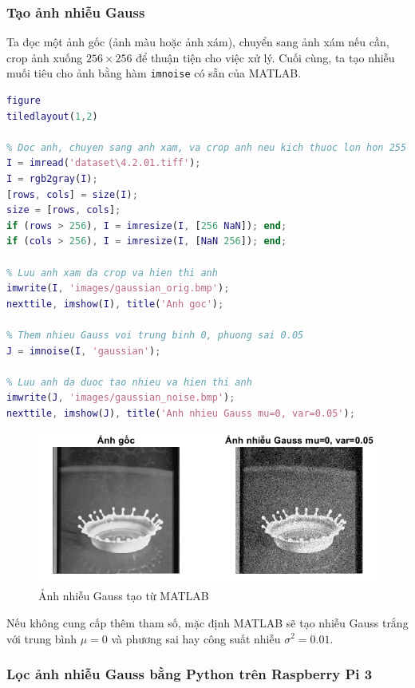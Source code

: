 \subsubsection{Tạo ảnh nhiễu Gauss}

Ta đọc một ảnh gốc (ảnh màu hoặc ảnh xám), chuyển sang ảnh xám nếu cần, crop ảnh xuống $256 \times 256$ để thuận tiện cho việc xử lý. Cuối cùng, ta tạo nhiễu muối tiêu cho ảnh bằng hàm \texttt{imnoise} có sẵn của MATLAB.

\begin{lstlisting}[language=MATLAB]
figure
tiledlayout(1,2)

% Doc anh, chuyen sang anh xam, va crop anh neu kich thuoc lon hon 255
I = imread('dataset\4.2.01.tiff');
I = rgb2gray(I);
[rows, cols] = size(I);
size = [rows, cols];
if (rows > 256), I = imresize(I, [256 NaN]); end;
if (cols > 256), I = imresize(I, [NaN 256]); end;

% Luu anh xam da crop va hien thi anh
imwrite(I, 'images/gaussian_orig.bmp');
nexttile, imshow(I), title('Anh goc');

% Them nhieu Gauss voi trung binh 0, phuong sai 0.05
J = imnoise(I, 'gaussian');

% Luu anh da duoc tao nhieu va hien thi anh
imwrite(J, 'images/gaussian_noise.bmp');
nexttile, imshow(J), title('Anh nhieu Gauss mu=0, var=0.05');
\end{lstlisting}

\begin{figure}[H]
    \centering
    \includegraphics[width=.75\linewidth]{images/gaussian_noise_matlab.png}
    \caption{Ảnh nhiễu Gauss tạo từ MATLAB}
    \label{fig:gaussian_noise_matlab}
\end{figure}

Nếu không cung cấp thêm tham số, mặc định MATLAB sẽ tạo nhiễu Gauss trắng với trung bình $\mu = 0$ và phương sai hay công suất nhiễu $\sigma^2 = 0.01$.

\subsubsection{Lọc ảnh nhiễu Gauss bằng Python trên Raspberry Pi 3}

